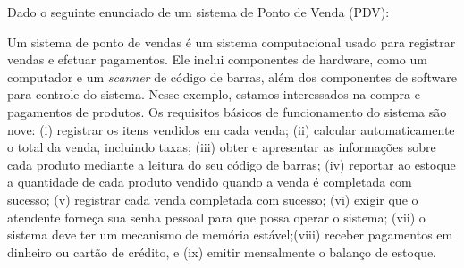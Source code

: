 \documentclass[12pt]{exam}
\begin{document}
  \begin{questions}
    
   
  \question 
    Dado o seguinte enunciado de um sistema de Ponto de Venda (PDV):
    
    Um sistema de ponto de vendas é um sistema computacional usado para registrar vendas e efetuar pagamentos. Ele inclui
    componentes de hardware, como um computador e um \textit{scanner} de código de barras, além dos componentes de software para 
    controle do sistema. Nesse exemplo, estamos interessados na compra e pagamentos de produtos. Os requisitos básicos de 
    funcionamento do sistema são nove: (i) registrar os itens vendidos em cada venda; (ii) calcular automaticamente o total 
    da venda, incluindo taxas; (iii) obter e apresentar as informações sobre cada produto mediante a leitura do seu código de 
    barras; (iv) reportar ao estoque a quantidade de cada produto vendido quando a venda é completada com sucesso; (v) registrar
    cada venda completada com sucesso; (vi) exigir que o atendente forneça sua senha pessoal para que possa operar o sistema; 
    (vii) o sistema deve ter um mecanismo de memória estável;(viii) receber pagamentos em dinheiro ou cartão de crédito, e 
    (ix) emitir mensalmente o balanço de estoque.
\end{questions}
\end{document}
